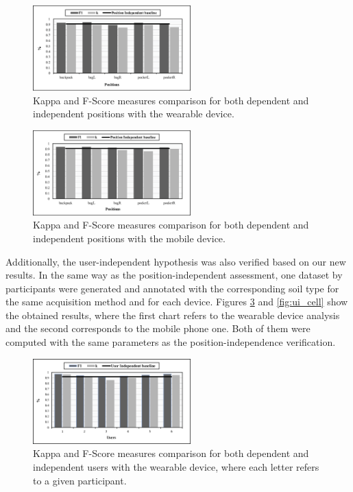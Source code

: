 \documentclass[10pt,conference]{IEEEtran}
\begin{document}
\begin{figure}[!ht]
  \centering
  \includegraphics[width=2.4in]{pi_wear.eps}
  \caption{Kappa and F-Score measures comparison for both dependent and independent positions with the wearable device.}
  \label{fig:pi_wear}
\end{figure}

\begin{figure}[!ht]
  \centering
  \includegraphics[width=2.4in]{pi_cell.eps}
  \caption{Kappa and F-Score measures comparison for both dependent and independent positions with the mobile device.}
  \label{fig:pi_cell}
\end{figure}

Additionally, the user-independent hypothesis was also verified based on our new results. In the same way as the position-independent assessment, one dataset by participants were generated and annotated with the corresponding soil type for the same acquisition method and for each device. Figures \ref{fig:ui_wear} and \ref{fig:ui_cell} show the obtained results, where the first chart refers to the wearable device analysis and the second corresponds to the mobile phone one. Both of them were computed with the same parameters as the position-independence verification. 

\begin{figure}[!ht]
	\centering
	\includegraphics[width=2.4in]{ui_wear.eps}
	\caption{Kappa and F-Score measures comparison for both dependent and independent users with the wearable device, where each letter refers to a given participant.}
	\label{fig:ui_wear}
\end{figure}
\end{document}

